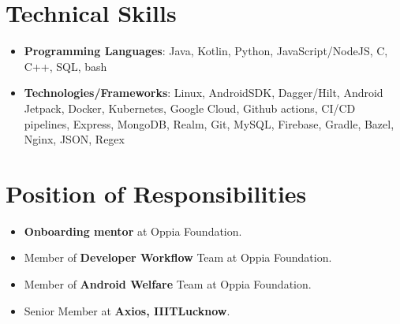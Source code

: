 \documentclass[letterpaper,11pt]{article}
\newcommand{\resumeSubHeadingListStart}{\begin{itemize}[leftmargin=*]}
\newcommand{\resumeSubHeadingListEnd}{\end{itemize}}
\begin{document}
%
\section{Technical Skills}
\resumeSubHeadingListStart
\item{
            \textbf{Programming Languages}{: Java, Kotlin, Python, JavaScript/NodeJS, C, C++, SQL, bash}
      }
\item{
            \textbf{Technologies/Frameworks}{: Linux, AndroidSDK, Dagger/Hilt, Android Jetpack, Docker, Kubernetes, Google Cloud, Github actions, CI/CD pipelines, Express, MongoDB, Realm, Git, MySQL, Firebase, Gradle, Bazel, Nginx, JSON, Regex}
      }
\resumeSubHeadingListEnd

\section{Position of Responsibilities}
\begin{itemize}
	\item \textbf{Onboarding mentor} at Oppia Foundation.
	\item Member of \textbf{Developer Workflow} Team at Oppia Foundation.
	\item Member of \textbf{Android Welfare} Team at Oppia Foundation.
	\item Senior Member at \textbf{Axios, IIITLucknow}.
\end{itemize}
\end{document}

